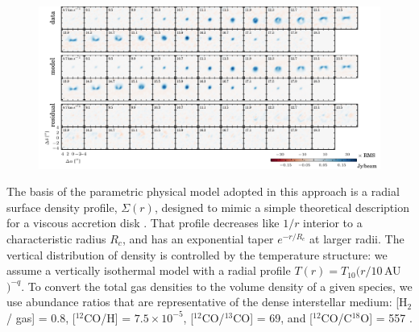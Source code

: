 \documentclass[twocolumn]{aastex61}
\begin{document}
\begin{figure}[ht!]
\begin{center}
  \includegraphics{chmaps_13CO.pdf}
  \end{center}
\end{figure}

The basis of the parametric physical model adopted in this approach is a radial surface density profile, $\Sigma(r)$, designed to mimic a simple theoretical description for a viscous accretion disk \citep{lyndenbell74,hartmann98}.  That profile decreases like $1/r$ interior to a characteristic radius $R_c$, and has an exponential taper $e^{-r/R_c}$ at larger radii.  The vertical distribution of density is controlled by the temperature structure: we assume a vertically isothermal model with a radial profile $T(r) = T_{10} (r/10$\,AU$)^{-q}$. To convert the total gas densities to the volume density of a given species, we use abundance ratios that are representative of the dense interstellar medium: [H$_2$/ gas] = 0.8, [$^{12}$CO/H] = $7.5 \times 10^{-5}$, [$^{12}$CO/$^{13}$CO] = 69, and [$^{12}$CO/C$^{18}$O] = 557 \citep[e.g.,][]{henkel94,prantzos96}.
\end{document}
